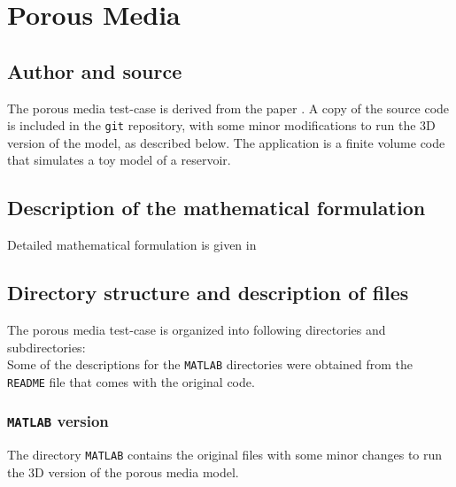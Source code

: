 \section{Porous Media}
\subsection{Author and source}
The porous media test-case is derived from the paper \cite{Aarnes_2007}. A copy of the source code is included in the \texttt{git} repository, with some minor modifications to run the 3D version of the model, as described below. The application is a finite volume code that simulates a toy model of a reservoir.
\subsection{Description of the mathematical formulation}\label{power_cont_adj_math}
Detailed mathematical formulation is given in \cite{Aarnes_2007}
\subsection{Directory structure and description of files}
The porous media test-case is organized into following directories and subdirectories:\\

\hfill\break
\noindent Some of the descriptions for the \texttt{MATLAB} directories were obtained from the \texttt{README} file that comes with the original code.
\clearpage
\subsubsection{\texttt{MATLAB} version}
The directory \texttt{MATLAB} contains the original files with some minor changes to run the 3D version of the porous media model.\\

